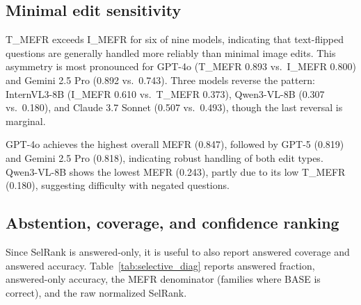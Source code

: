 \documentclass[11pt]{article}
\begin{document}
\subsection{Minimal edit sensitivity}

T\_MEFR exceeds I\_MEFR for six of nine models, indicating that text-flipped questions are generally handled more reliably than minimal image edits. This asymmetry is most pronounced for GPT-4o (T\_MEFR 0.893 vs.\ I\_MEFR 0.800) and Gemini 2.5 Pro (0.892 vs.\ 0.743). Three models reverse the pattern: InternVL3-8B (I\_MEFR 0.610 vs.\ T\_MEFR 0.373), Qwen3-VL-8B (0.307 vs.\ 0.180), and Claude 3.7 Sonnet (0.507 vs.\ 0.493), though the last reversal is marginal.

GPT-4o achieves the highest overall MEFR (0.847), followed by GPT-5 (0.819) and Gemini 2.5 Pro (0.818), indicating robust handling of both edit types. Qwen3-VL-8B shows the lowest MEFR (0.243), partly due to its low T\_MEFR (0.180), suggesting difficulty with negated questions.

\subsection{Abstention, coverage, and confidence ranking}

Since SelRank is answered-only, it is useful to also report answered coverage and answered accuracy. Table~\ref{tab:selective_diag} reports answered fraction, answered-only accuracy, the MEFR denominator (families where BASE is correct), and the raw normalized SelRank.
\end{document}
